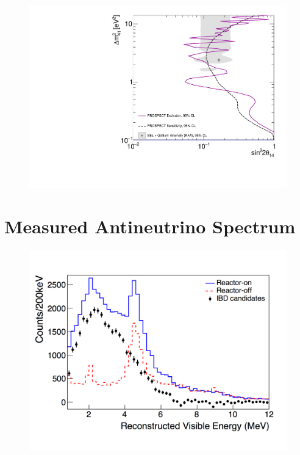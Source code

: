 \begin{figure}[H]
	\centering
	\includegraphics[width=0.7\linewidth]{tex/7-oscillation-images/Exclusion_Sensitivity_Final}
	\caption{}
	\label{fig:exclusionsensitivityfinal}
\end{figure}



\section{Measured Antineutrino Spectrum}
\begin{figure}[H]
	\centering
	\includegraphics[width=0.7\linewidth]{tex/7-oscillation-images/Spectrum}
	\caption{}
	\label{fig:spectrumresults}
\end{figure}



